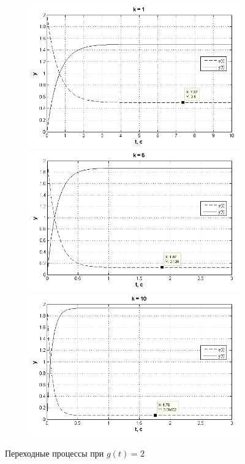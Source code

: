 \documentclass[a4paper, 11pt, russian]{article}
\begin{document}
    \begin{figure}[h!]
        \centering
        \begin{subfigure}[h]{0.7\textwidth}
            \includegraphics[width = \textwidth]{constInput0ast1k.png}
            \\
            \includegraphics[width = \textwidth]{constInput0ast5k.png}
            \\
            \includegraphics[width = \textwidth]{constInput0ast10k.png}
        \end{subfigure}
        \caption{Переходные процессы при $g(t) = 2$}
    \end{figure}
    \vspace{1.5cm} %
\end{document}
